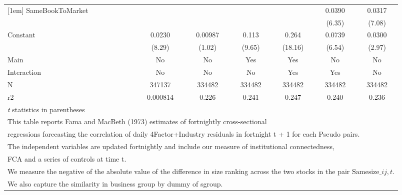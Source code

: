 {\begin{tabular}{l*{6}{c}}
[1em]
SameBookToMarket    &                     &                     &                     &                     &      0.0390\sym{***}&      0.0317\sym{***}\\
                    &                     &                     &                     &                     &      (6.35)         &      (7.08)         \\
[1em]
Constant            &      0.0230\sym{***}&     0.00987         &       0.113\sym{***}&       0.264\sym{***}&      0.0739\sym{***}&      0.0300\sym{**} \\
                    &      (8.29)         &      (1.02)         &      (9.65)         &     (18.16)         &      (6.54)         &      (2.97)         \\
\hline
Main                &          No         &          No         &         Yes         &         Yes         &          No         &          No         \\
Interaction         &          No         &          No         &          No         &         Yes         &         Yes         &          No         \\
N                   &      347137         &      334482         &      334482         &      334482         &      334482         &      334482         \\
r2                  &    0.000814         &       0.226         &       0.241         &       0.247         &       0.240         &       0.236         \\
\hline\hline
\multicolumn{7}{l}{\footnotesize \textit{t} statistics in parentheses}\\
\multicolumn{7}{l}{\footnotesize This table reports Fama and MacBeth (1973) estimates of fortnightly cross-sectional}\\
\multicolumn{7}{l}{\footnotesize  regressions forecasting the correlation of daily 4Factor+Industry residuals in fortnight t + 1 for each Pseudo pairs.}\\
\multicolumn{7}{l}{\footnotesize The independent variables are updated fortnightly and include our measure of institutional connectedness,}\\
\multicolumn{7}{l}{\footnotesize  FCA and a series of controls at time t.}\\
\multicolumn{7}{l}{\footnotesize We measure the negative of the absolute value of the difference in size ranking across the two stocks in the pair $ \text{Samesize}\_{ij,t} $.}\\
\multicolumn{7}{l}{\footnotesize We also capture the similarity in business group by dummy of sgroup.}\\

\end{tabular}}
